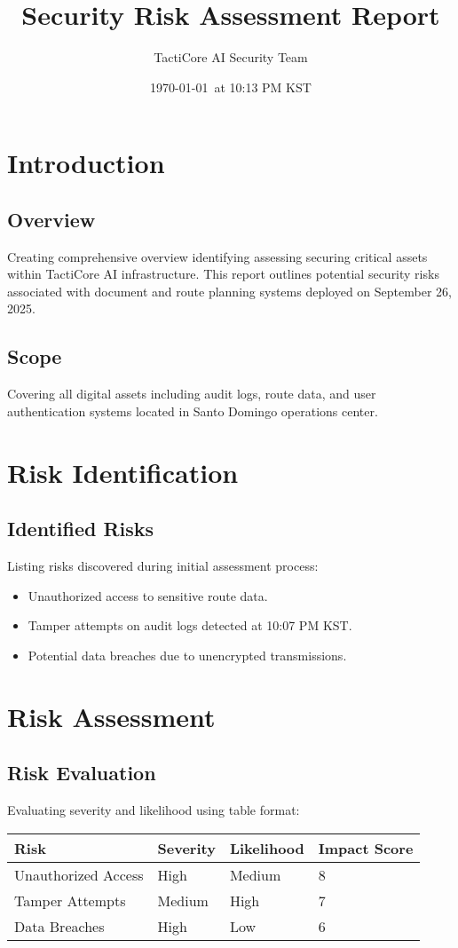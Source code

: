 \documentclass[a4paper,12pt]{report}
\title{Security Risk Assessment Report}
\author{TactiCore AI Security Team}
\date{\today\ at 10:13 PM KST}
\begin{document}
\maketitle
\thispagestyle{empty}
\clearpage

\tableofcontents
\clearpage

\chapter{Introduction}
\section{Overview}
Creating comprehensive overview identifying assessing securing critical assets within TactiCore AI infrastructure. This report outlines potential security risks associated with document and route planning systems deployed on September 26, 2025.

\section{Scope}
Covering all digital assets including audit logs, route data, and user authentication systems located in Santo Domingo operations center.

\chapter{Risk Identification}
\section{Identified Risks}
Listing risks discovered during initial assessment process:
\begin{itemize}[leftmargin=*]
    \item Unauthorized access to sensitive route data.
    \item Tamper attempts on audit logs detected at 10:07 PM KST.
    \item Potential data breaches due to unencrypted transmissions.
\end{itemize}

\chapter{Risk Assessment}
\section{Risk Evaluation}
Evaluating severity and likelihood using table format:
\begin{longtable}{|p{4cm}|p{3cm}|p{3cm}|p{3cm}|}
\hline
\textbf{Risk} & \textbf{Severity} & \textbf{Likelihood} & \textbf{Impact Score} \\ \hline
Unauthorized Access & High & Medium & 8 \\ \hline
Tamper Attempts & Medium & High & 7 \\ \hline
Data Breaches & High & Low & 6 \\ \hline
\end{longtable}
\end{document}
